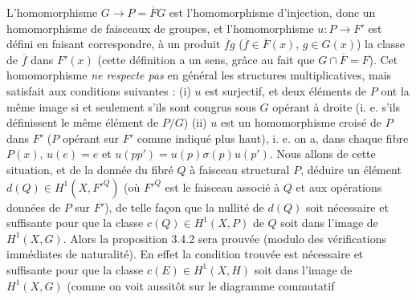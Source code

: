 L'homomorphisme $G\to P=\overline F G$ est l'homomorphisme
d'injection, donc un homomorphisme de faisceaux de groupes, et
l'homomorphisme $u:P\to F'$ est défini en faisant correspondre,
à un produit $\overline f g$ ($\overline f\in\overline F(x)$,
$g\in G(x)$) la classe de $\overline f$ dans $F'(x)$ (cette définition a un
sens, grâce au fait que $G\cap\overline F=F$).
Cet homomorphisme \textit{ne respecte pas} en général les structures
multiplicatives, mais satisfait aux conditions suivantes : (i) $u$ est
surjectif, et deux éléments de $P$ ont la même image si et seulement s'ils
sont congrus sous $G$ opérant à droite (i. e. s'ils définissent le même
élément de $P/G$) (ii) $u$ est un homomorphisme croisé de $P$ dans $F'$
($P$ opérant sur $F'$ comme indiqué plus haut), i. e. on a, dans chaque fibre
$P(x)$, $u(e)=e$ et $u(pp')=u(p)\sigma(p)u(p')$.
Nous allons de cette situation, et de la donnée du fibré $Q$ à faisceau
structural $P$, déduire un élément $d(Q)\in H^1(X,{F'}^Q)$ (où ${F'}^Q$ est
le faisceau associé à $Q$ et aux opérations données de $P$ sur $F'$), de telle
façon que la nullité de $d(Q)$ soit nécessaire et suffisante pour que la
classe $c(Q)\in H^1(X,P)$ de $Q$ soit dans l'image de $H^1(X,G)$. Alors la
proposition 3.4.2 sera prouvée (modulo des vérifications immédiates de
naturalité).
En effet la condition trouvée est nécessaire et suffisante pour que la classe
$c(E)\in H^1(X,H)$ soit dans l'image de $H^1(X,G)$ (comme on voit aussitôt
sur le diagramme commutatif

